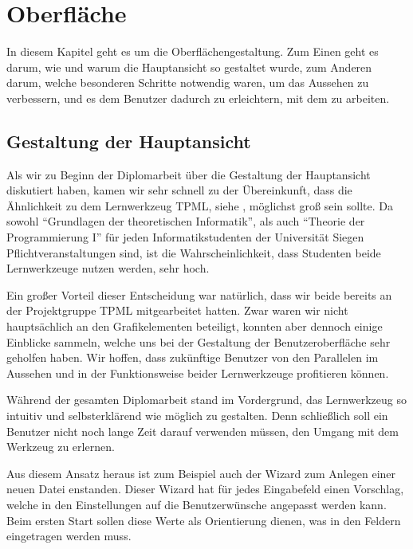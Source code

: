 



\chapter{Oberfläche}\label{GUI}

In diesem Kapitel geht es um die Oberflächengestaltung. Zum Einen geht es darum,
wie und warum die Hauptansicht so gestaltet wurde, zum Anderen darum, welche
besonderen Schritte notwendig waren, um das Aussehen zu verbessern, und es dem
Benutzer dadurch zu erleichtern, mit dem \gtitool zu arbeiten.\vspace{10pt}


\section{Gestaltung der Hauptansicht}\label{GUIMain}

Als wir zu Beginn der Diplomarbeit über die Gestaltung der Hauptansicht
diskutiert haben, kamen wir sehr schnell zu der Übereinkunft, dass die
Ähnlichkeit zu dem Lernwerkzeug TPML, siehe \cite{tpml}, möglichst groß sein
sollte. Da sowohl "`Grundlagen der theoretischen Informatik"', als auch "`Theorie der
Programmierung I"' für jeden Informatikstudenten der Universität Siegen
Pflichtveranstaltungen sind, ist die Wahrscheinlichkeit, dass Studenten beide
Lernwerkzeuge nutzen werden, sehr hoch.\vspace{10pt}

Ein großer Vorteil dieser Entscheidung war natürlich, dass wir beide
bereits an der Projektgruppe TPML mitgearbeitet hatten. Zwar waren wir nicht
hauptsächlich an den Grafikelementen beteiligt, konnten aber dennoch einige
Einblicke sammeln, welche uns bei der Gestaltung der Benutzeroberfläche sehr
geholfen haben. Wir hoffen, dass zukünftige Benutzer von den Parallelen im Aussehen
und in der Funktionsweise beider Lernwerkzeuge profitieren können.\vspace{10pt}

Während der gesamten Diplomarbeit stand im Vordergrund, das Lernwerkzeug so
intuitiv und selbsterklärend wie möglich zu gestalten. Denn schließlich soll
ein Benutzer nicht noch lange Zeit darauf verwenden müssen, den Umgang mit dem
Werkzeug zu erlernen.\vspace{10pt}

Aus diesem Ansatz heraus ist zum Beispiel auch der Wizard zum Anlegen einer
neuen Datei enstanden. Dieser Wizard hat für jedes Eingabefeld einen
Vorschlag, welche in den Einstellungen auf die Benutzerwünsche angepasst werden
kann. Beim ersten Start sollen diese Werte als Orientierung dienen, was in den
Feldern eingetragen werden muss.
\vspace{10pt}


